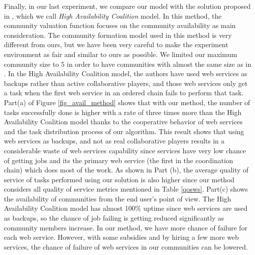 \documentclass[10pt,journal,cspaper,compsoc]{IEEEtran}
\begin{document}
Finally, in our last experiment, we compare our model with the
solution proposed in \cite{10.1109/TSC.2012.12}, which we call
\emph{High Availability Coalition} model. In this method, the
community valuation function focuses on the community availability
as main consideration. The community formation model used in this
method is very different from ours, but we have been very careful
to make the experiment environment as fair and similar to ours as
possible. We limited our maximum community size to 5 in order to
have communities with almost the same size as in
\cite{10.1109/TSC.2012.12}. In the High Availability Coalition
model, the authors have used web services as backups rather than
active collaborative players, and those web services only get a
task when the first web service in an ordered chain fails to
perform that task. %
Part(a) of Figure \ref{fig_avail_method} shows that with our
method, the number of tasks successfully done is higher with a
rate of three times more than the High Availability Coalition
model thanks to the cooperative behavior of web services and the
task distribution process of our algorithm. This result shows that
using web services as backups, and not as real collaborative
players results in a considerable waste of web services capability
since services have very low chance of getting jobs and its the
primary web service (the first in the coordination chain) which
does most of the work. As shown in Part (b), the average quality
of service of tasks performed using our solution is also higher
since our method considers all quality of service metrics
mentioned in Table \ref{qosws}. Part(c) shows the availability of
communities from the end user's point of view. The High
Availability Coalition model has almost 100\% uptime since web
services are used as backups, so the chance of job failing is
getting reduced significantly as community members increase. In
our method, we have more chance of failure for each web service.
However, with some subsidies and by hiring a few more web
services, the chance of failure of web services in our communities
can be lowered.



\end{document}
